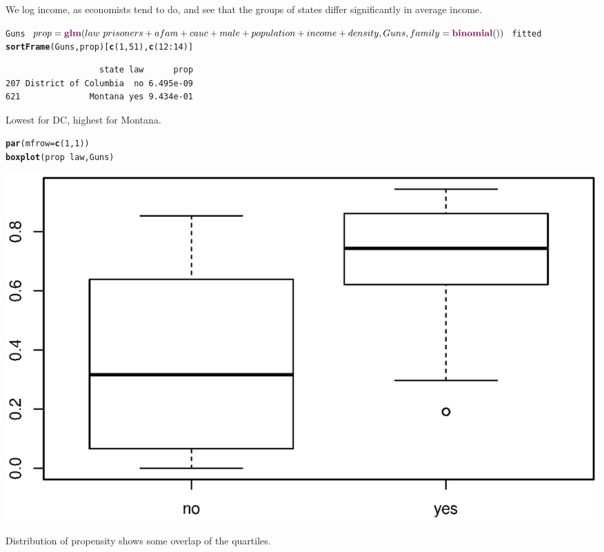 \documentclass{article}\usepackage{graphicx, color}
\makeatletter
\newcommand{\hlfunctioncall}[1]{\textcolor[rgb]{0.501960784313725,0,0.329411764705882}{\textbf{#1}}}%
\newenvironment{kframe}{%
 \def\at@end@of@kframe{}%
 \ifinner\ifhmode%
  \def\at@end@of@kframe{\end{minipage}}%
  \begin{minipage}{\columnwidth}%
 \fi\fi%
 \def\FrameCommand##1{\hskip\@totalleftmargin \hskip-\fboxsep
 \colorbox{shadecolor}{##1}\hskip-\fboxsep
     \hskip-\linewidth \hskip-\@totalleftmargin \hskip\columnwidth}%
 \MakeFramed {\advance\hsize-\width
   \@totalleftmargin\z@ \linewidth\hsize
   \@setminipage}}%
 {\par\unskip\endMakeFramed%
 \at@end@of@kframe}
\newenvironment{knitrout}{}{} %
\makeatother
\begin{document}
We log income, as economists tend to do, and see that the groups of states differ significantly in average income.
\begin{knitrout}
\color{fgcolor}\begin{kframe}
\begin{alltt}
Guns$prop=\hlfunctioncall{glm}(law~prisoners+afam+cauc+male+population+income+density, 
    Guns, family=\hlfunctioncall{binomial}())$fitted
\hlfunctioncall{sortFrame}(Guns,prop)[\hlfunctioncall{c}(1,51),\hlfunctioncall{c}(12:14)]
\end{alltt}
\begin{verbatim}
                   state law      prop
207 District of Columbia  no 6.495e-09
621              Montana yes 9.434e-01
\end{verbatim}
\end{kframe}
\end{knitrout}

Lowest for DC, highest for Montana. 
\begin{knitrout}
\color{fgcolor}\begin{kframe}
\begin{alltt}
\hlfunctioncall{par}(mfrow=\hlfunctioncall{c}(1,1))
\hlfunctioncall{boxplot}(prop~law, Guns)
\end{alltt}
\end{kframe}

{\centering \includegraphics[width=\linewidth]{plots/unnamed-chunk-19} 

}


\end{knitrout}

Distribution of propensity shows some overlap of the quartiles.
\end{document}

